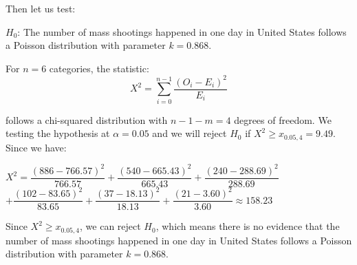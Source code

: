 \documentclass[12pt]{article}
\begin{document}
Then let us test:
\begin{center}
$H_0$: The number of mass shootings happened in one day in United States follows a Poisson distribution with parameter $k=0.868$.
\end{center}
\par For $n=6$ categories, the statistic:
\begin{equation*}
X^2=\sum_{i=0}^{n-1}\dfrac{(O_i-E_i)^2}{E_i}
\end{equation*}
\par follows a chi-squared distribution with $n-1-m=4$ degrees of freedom. We testing the hypothesis at $\alpha=0.05$ and we will reject $H_0$ if $X^2\geq x_{0.05,4}=9.49$. Since we have:
\begin{center}
$X^2=\dfrac{(886-766.57)^2}{766.57}+\dfrac{(540-665.43)^2}{665.43}+\dfrac{(240-288.69)^2}{288.69}$\\
$+\dfrac{(102-83.65)^2}{83.65}+\dfrac{(37-18.13)^2}{18.13}+\dfrac{(21-3.60)^2}{3.60}\approx158.23$
\end{center}
\par Since $X^2\geq x_{0.05,4}$, we can reject $H_0$, which means there is no evidence that the number of mass shootings happened in one day in United States follows a Poisson distribution with parameter $k=0.868$.\\
\end{document}

